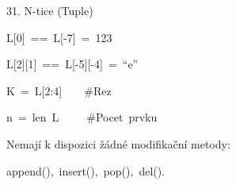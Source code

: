 \documentclass[czech]{beamer}
\newenvironment{lyxcode}
  {\par\begin{list}{}{
    \setlength{\rightmargin}{\leftmargin}
    \setlength{\listparindent}{0pt}%
    \raggedright
    \setlength{\itemsep}{0pt}
    \setlength{\parsep}{0pt}
    \normalfont\ttfamily}%
   \def\{{\char`\{}
   \def\}{\char`\}}
   \def\textasciitilde{\char`\~}
   \item[]}
  {\end{list}}
\begin{document}
\begin{frame}{31. N-tice (Tuple)}
\begin{lyxcode}
{\scriptsize L{[}0{]}~==~L{[}-7{]}~=~123}{\scriptsize\par}

{\scriptsize L{[}2{]}{[}1{]}~==~L{[}-5{]}{[}-4{]}~=~``e''}{\scriptsize\par}

{\scriptsize K~=~L{[}2:4{]}~~~~\#Rez}{\scriptsize\par}

{\scriptsize n~=~len~L~~~~~\#Pocet~prvku}{\scriptsize\par}
\end{lyxcode}
{\scriptsize Nemají k dispozici žádné modifikační metody:}{\scriptsize\par}
\begin{lyxcode}
{\scriptsize append(),~insert(),~pop(),~del().}{\scriptsize\par}
\end{lyxcode}
\end{frame}
\end{document}
